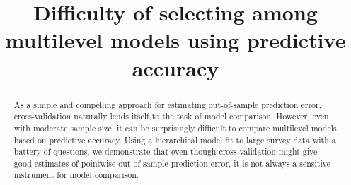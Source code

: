 \documentclass[sii]{ipart}
\begin{document}
\begin{frontmatter}

\title{Difficulty of selecting among multilevel models using predictive accuracy}


\begin{abstract}
  As a simple and compelling approach for estimating out-of-sample prediction
  error, cross-validation naturally lends itself to the task of model
  comparison. However, even with moderate sample size, it can be surprisingly
  difficult to compare multilevel models based on predictive accuracy.  Using a
  hierarchical model fit to large survey data with a battery of questions, we
  demonstrate that even though cross-validation might give good estimates of
  pointwise out-of-sample prediction error, it is not always a sensitive
  instrument for model comparison.

\end{abstract}

\begin{keyword}[class=AMS] %
\end{keyword}

\begin{keyword}
\end{keyword}


\end{frontmatter}
\end{document}
